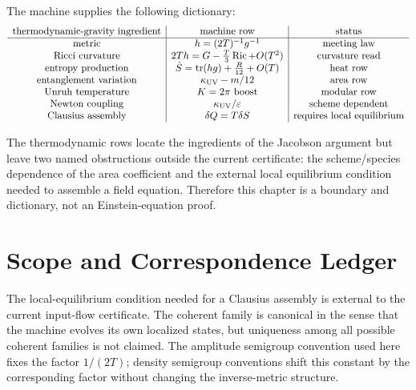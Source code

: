 \begin{principle}
\label{prin:innovation-input-thermo-jacobson-dictionary}
The machine supplies the following dictionary:
$$
\begin{array}{c|c|c}
\text{thermodynamic-gravity ingredient} & \text{machine row} & \text{status}\\
\hline
\text{metric} & h=(2T)^{-1}g^{-1} & \text{meeting law}\\
\text{Ricci curvature} & 2Th=G-\frac{T}{3}\operatorname{Ric}+O(T^2) & \text{curvature read}\\
\text{entropy production} & \dot S=\operatorname{tr}(hg)+\frac{R}{12}+O(T) & \text{heat row}\\
\text{entanglement variation} & \kappa_{\rm UV}-m/12 & \text{area row}\\
\text{Unruh temperature} & K=2\pi\text{ boost} & \text{modular row}\\
\text{Newton coupling} & \kappa_{\rm UV}/\varepsilon & \text{scheme dependent}\\
\text{Clausius assembly} & \delta Q=T\delta S & \text{requires local equilibrium}
\end{array}
$$
\end{principle}

\begin{principle}
\label{prin:innovation-input-thermo-remaining-obstructions}
The thermodynamic rows locate the ingredients of the Jacobson argument but
leave two named obstructions outside the current certificate: the
scheme/species dependence of the area coefficient and the external local
equilibrium condition needed to assemble a field equation. Therefore this
chapter is a boundary and dictionary, not an Einstein-equation proof.
\end{principle}

\section{Scope and Correspondence Ledger}
\label{sec:innovation-input-thermo-scope-ledger}

\begin{principle}
\label{prin:innovation-input-thermo-structural-assumptions}
The local-equilibrium condition needed for a Clausius assembly is external
to the current input-flow certificate. The coherent family is canonical in
the sense that the machine evolves its own localized states, but uniqueness
among all possible coherent families is not claimed. The amplitude
semigroup convention used here fixes the factor $1/(2T)$; density
semigroup conventions shift this constant by the corresponding factor
without changing the inverse-metric structure.
\end{principle}

